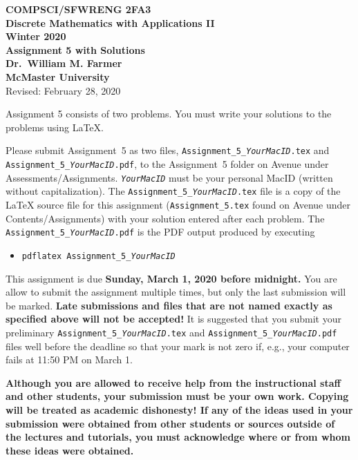 \documentclass[11pt,fleqn]{article}
\begin{document}
\begin{center}

  {\large \textbf{COMPSCI/SFWRENG 2FA3}}\\[2mm]
  {\large \textbf{Discrete Mathematics with Applications II}}\\[2mm]
  {\large \textbf{Winter 2020}}\\[8mm]
  {\huge \textbf{Assignment 5 with Solutions}}\\[6mm]
  {\large \textbf{Dr.~William M. Farmer}}\\[2mm]
  {\large \textbf{McMaster University}}\\[6mm]
  {\large Revised: February 28, 2020}

\end{center}

\medskip

Assignment 5 consists of two problems.  You must write your solutions
to the problems using LaTeX.

Please submit Assignment~5 as two files,
\texttt{Assignment\_5\_\emph{YourMacID}.tex} and
\texttt{Assignment\_5\_\emph{YourMacID}.pdf}, to the Assignment~5
folder on Avenue under Assessments/Assignments.
\texttt{\emph{YourMacID}} must be your personal MacID (written without
capitalization).  The \texttt{Assignment\_5\_\emph{YourMacID}.tex}
file is a copy of the LaTeX source file for this assignment
(\texttt{Assignment\_5.tex} found on Avenue under
Contents/Assignments) with your solution entered after each problem.
The \texttt{Assignment\_5\_\emph{YourMacID}.pdf} is the PDF output
produced by executing

\begin{itemize}

  \item[] \texttt{pdflatex Assignment\_5\_\emph{YourMacID}}

\end{itemize}

This assignment is due \textbf{Sunday, March 1, 2020 before
  midnight.}  You are allow to submit the assignment multiple times,
but only the last submission will be marked.  \textbf{Late submissions
  and files that are not named exactly as specified above will not be
  accepted!}  It is suggested that you submit your preliminary
\texttt{Assignment\_5\_\emph{YourMacID}.tex} and
\texttt{Assignment\_5\_\emph{YourMacID}.pdf} files well before the
deadline so that your mark is not zero if, e.g., your computer fails
at 11:50 PM on March 1.

\textbf{Although you are allowed to receive help from the
  instructional staff and other students, your submission must be your
  own work.  Copying will be treated as academic dishonesty! If any of
  the ideas used in your submission were obtained from other students
  or sources outside of the lectures and tutorials, you must
  acknowledge where or from whom these ideas were obtained.}
\end{document}
